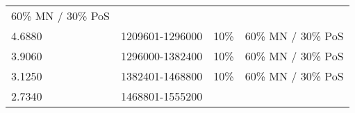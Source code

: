 \documentclass[11pt,a4paperpaper,]{report}
\begin{document}
\begin{longtable}[c]{@{}llll@{}}
\begin{minipage}[t]{0.27\columnwidth}
60\% MN / 30\% PoS
\strut\end{minipage}\tabularnewline
\begin{minipage}[t]{0.12\columnwidth}\raggedright\strut
4.6880
\strut\end{minipage} &
\begin{minipage}[t]{0.22\columnwidth}\raggedright\strut
1209601-1296000
\strut\end{minipage} &
\begin{minipage}[t]{0.15\columnwidth}\raggedright\strut
10\%
\strut\end{minipage} &
\begin{minipage}[t]{0.27\columnwidth}\raggedright\strut
60\% MN / 30\% PoS
\strut\end{minipage}\tabularnewline
\begin{minipage}[t]{0.12\columnwidth}\raggedright\strut
3.9060
\strut\end{minipage} &
\begin{minipage}[t]{0.22\columnwidth}\raggedright\strut
1296000-1382400
\strut\end{minipage} &
\begin{minipage}[t]{0.15\columnwidth}\raggedright\strut
10\%
\strut\end{minipage} &
\begin{minipage}[t]{0.27\columnwidth}\raggedright\strut
60\% MN / 30\% PoS
\strut\end{minipage}\tabularnewline
\begin{minipage}[t]{0.12\columnwidth}\raggedright\strut
3.1250
\strut\end{minipage} &
\begin{minipage}[t]{0.22\columnwidth}\raggedright\strut
1382401-1468800
\strut\end{minipage} &
\begin{minipage}[t]{0.15\columnwidth}\raggedright\strut
10\%
\strut\end{minipage} &
\begin{minipage}[t]{0.27\columnwidth}\raggedright\strut
60\% MN / 30\% PoS
\strut\end{minipage}\tabularnewline
\begin{minipage}[t]{0.12\columnwidth}\raggedright\strut
2.7340
\strut\end{minipage} &
\begin{minipage}[t]{0.22\columnwidth}\raggedright\strut
1468801-1555200
\strut\end{minipage} &
\begin{minipage}[t]{0.15\columnwidth}\raggedright\strut

\end{minipage}
\end{longtable}
\end{document}
